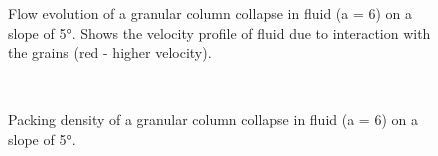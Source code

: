 \documentclass[epj,twocolumn]{webofc}
\begin{document}
\begin{figure}
\caption[Flow evolution of a granular column collapse in fluid (a = 6) on a 
slope of 5\si{\degree}]{Flow evolution of a granular column collapse in fluid 
(a = 6) on a slope of 5\si{\degree}. Shows the velocity profile of fluid due to 
interaction with the grains (red - higher velocity).}
\label{fig:a6_slope_snapshots}
\end{figure}



\begin{figure}
\\
\caption{Packing density of a granular column collapse in fluid (a = 6) on a 
slope of 5\si{\degree}.}
\label{fig:a6_slope_voro}
\end{figure}
\end{document}
